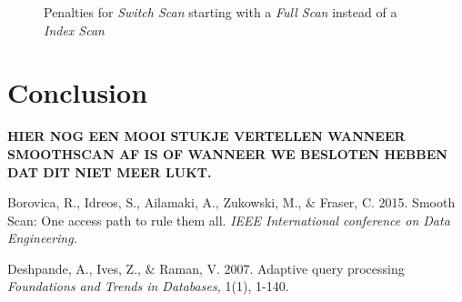 \documentclass[a4paper,11pt,twoside]{article}
\begin{document}
\begin{figure}[ht!]
\centering
{}
\quad
{}
%	
\caption{Penalties for \textit{Switch Scan} starting with a \textit{Full Scan} instead of a \textit{Index Scan}}
\label{fig:result3}
\end{figure}
\pagebreak

\section{Conclusion}
\textbf{HIER NOG EEN MOOI STUKJE VERTELLEN WANNEER SMOOTHSCAN AF IS OF WANNEER WE BESLOTEN HEBBEN DAT DIT NIET MEER LUKT.}

\begin{thebibliography}{9}

	 Borovica, R., Idreos, S., Ailamaki, A., Zukowski, M., $\&$ Fraser, C.
	2015.	
 	Smooth Scan: One access path to rule them all.
	\emph{IEEE International conference on Data Engineering.}

	Deshpande, A., Ives, Z., $\&$ Raman, V.
	2007.
	Adaptive query processing
	\emph{Foundations and Trends in Databases,}
	1(1), 1-140.
\end{thebibliography}
\newpage
\end{document}
